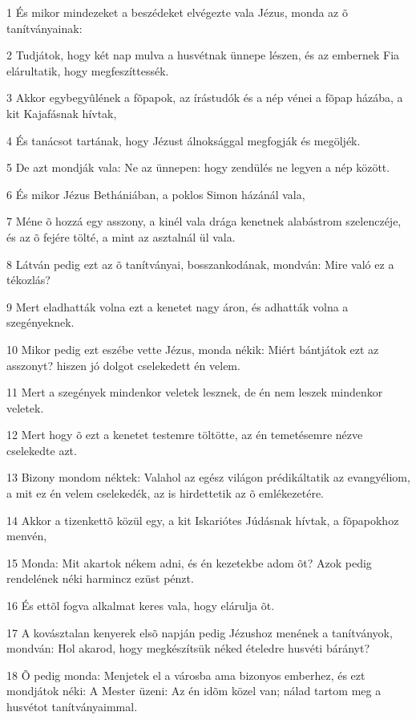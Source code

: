 \par 1 És mikor mindezeket a beszédeket elvégezte vala Jézus, monda az õ tanítványainak:
\par 2 Tudjátok, hogy két nap mulva a husvétnak ünnepe lészen, és az embernek Fia  elárultatik, hogy megfeszíttessék.
\par 3 Akkor egybegyûlének a fõpapok, az írástudók és a nép vénei a fõpap házába, a kit Kajafásnak hívtak,
\par 4 És tanácsot tartának, hogy Jézust álnoksággal megfogják és megöljék.
\par 5 De azt mondják vala: Ne az ünnepen: hogy zendülés ne legyen a nép között.
\par 6 És mikor Jézus Bethániában, a poklos Simon házánál vala,
\par 7 Méne õ hozzá egy asszony, a kinél vala drága kenetnek alabástrom szelenczéje, és az õ fejére tölté, a mint az asztalnál ül vala.
\par 8 Látván pedig ezt az õ tanítványai, bosszankodának, mondván: Mire való ez a tékozlás?
\par 9 Mert eladhatták volna ezt a kenetet nagy áron, és adhatták volna a szegényeknek.
\par 10 Mikor pedig ezt eszébe vette Jézus, monda nékik: Miért bántjátok ezt az asszonyt? hiszen jó dolgot cselekedett én velem.
\par 11 Mert a szegények mindenkor veletek lesznek, de én nem leszek mindenkor veletek.
\par 12 Mert hogy õ ezt a kenetet testemre töltötte, az én temetésemre nézve cselekedte azt.
\par 13 Bizony mondom néktek: Valahol az egész világon prédikáltatik az evangyéliom, a mit ez én velem cselekedék, az is hirdettetik az õ emlékezetére.
\par 14 Akkor a tizenkettõ közül egy, a kit Iskariótes Júdásnak hívtak, a fõpapokhoz menvén,
\par 15 Monda: Mit akartok nékem adni, és én kezetekbe adom õt?  Azok pedig rendelének néki harmincz ezüst pénzt.
\par 16 És ettõl fogva alkalmat keres vala, hogy elárulja õt.
\par 17 A kovásztalan kenyerek elsõ napján pedig Jézushoz menének a tanítványok, mondván: Hol akarod, hogy megkészítsük néked ételedre  husvéti bárányt?
\par 18 Õ pedig monda: Menjetek el a városba ama bizonyos emberhez, és ezt mondjátok néki: A Mester üzeni: Az én idõm közel van; nálad tartom meg a husvétot tanítványaimmal.
